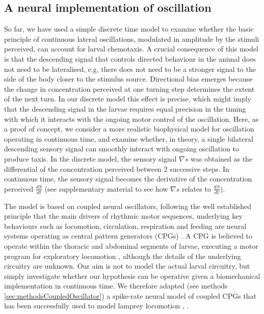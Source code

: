 \documentclass[11pt,a4paper]{article}
\begin{document}
\subsection{A neural implementation of oscillation}
So far, we have used a simple discrete time model to examine whether the basic principle of continuous lateral oscillations, modulated in amplitude by the stimuli perceived, can account for larval chemotaxis. A crucial consequence of this model is that the descending signal that controls directed behaviour in the animal does not need to be lateralised, e.g, there does not need to be a stronger signal to the side of the body closer to the stimulus source. Directional bias emerges because the change in concentration perceived at one turning step determines the extent of the next turn. In our discrete model this effect is precise, which might imply that the descending signal in the larvae requires equal precision in the timing with which it interacts with the ongoing motor control of the oscillation. Here, as a proof of concept, we consider a more realistic biophysical model for oscillation operating in continuous time, and examine whether, in theory, a single bilateral descending sensory signal can smoothly interact with ongoing oscillation to produce taxis. In the discrete model, the sensory signal $\nabla s$ was obtained as the differential of the concentration perceived between 2 successive steps. In continuous time, the sensory signal becomes the derivative of the concentration perceived $\frac{dS}{dt}$ (see supplementary material to see how $\nabla s$ relates to $\frac{dS}{dt}$).  

The model is based on coupled neural oscillators, following the well established principle that the main drivers of rhythmic  motor sequences, underlying key behaviours such as locomotion, circulation, respiration and feeding are neural systems operating as central pattern generators (CPGs) \citep{delcomyn1980neural}. A CPG is believed to operate  within the thoracic and abdominal segments of larvae, executing a motor program for exploratory locomotion \citep{hughes2007sensory,berni2012autonomous,lemon2015whole}, although the details of the underlying circuitry are unknown. Our aim is not to model the actual larval circuitry, but simply investigate whether our hypothesis can be operative given a biomechanical implementation in continuous time. We therefore adapted (see methods \ref{sec:methodsCoupledOscillator}) a spike-rate neural model of coupled CPGs that has been successfully used to model lamprey locomotion \citep{cohen1992modelling,lansner1997realistic}, \cite[see][]{marder1996principles}.
\end{document}
